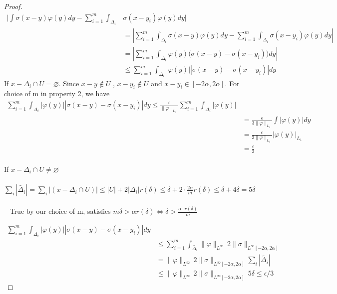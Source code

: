 \documentclass[../main.tex]{subfiles}
\begin{document}
\begin{proof}
\begin{equation*} 
	\begin{split}
		\Bigg| \int \sigma(x-y)\varphi(y)dy -  \sum_{i=1}^m \int_{\Delta_i}& \sigma(x-y_i) \varphi(y)dy \Bigg|  \\
		& = \left|  \sum_{i=1}^m \int_{\Delta_i}\sigma(x-y)\varphi(y)dy -  \sum_{i=1}^m \int_{\Delta_i}\sigma(x-y_i)\varphi(y)dy \right|  \\
		& =  \left|  \sum_{i=1}^m \int_{\Delta_i}\varphi(y)\Big( \sigma(x-y) - \sigma(x-y_i)\Big)dy \right| \\
		&\leq  \sum_{i=1}^m \int_{\Delta_i} \left| \varphi(y)\right| \left| \sigma(x-y)-\sigma(x-y_i)\right|dy 
	\end{split}
\end{equation*}
		If $x-\Delta_i \cap U = \varnothing $. Since $x-y \notin U$ , $x-y_i \notin U$ and $x-y_i \in [-2\alpha,2\alpha]$. For choice of m in property 2, we have\\ 
		\begin{equation*}
			\begin{split}
				\sum_{i=1}^m  \int_{\Delta_i} \left| \varphi(y)\right| \left| \sigma(x-y)-\sigma(x-y_i)\right|dy  \leq  \frac{\epsilon}{\| \varphi\|_{L_1}}  \sum_{i=1}^m  \int_{\Delta_i} \left| \varphi(y)\right| & \\
				& =  \frac{\epsilon}{3\| \varphi\|_{L_1}} \int \left|\varphi(y)\right| dy \\
				& =  \frac{\epsilon}{3\| \varphi\|_{L_1}} \left|\varphi(y)\right|_{L_1}  \\
				& = \frac{\epsilon}{3} 
			\end{split}
		\end{equation*}
		\\ 
		\noindent If $x-\Delta_i \cap U \neq \varnothing$\\ \\ 
		$\sum_i |\tilde{\Delta_i}| = \sum_i|(x-\Delta_i \cap U)| \leq |U|+2|\Delta_i| r(\delta) \leq \delta + 2 \cdot \frac{2\alpha}{m} r(\delta) \leq \delta +4\delta = 5\delta$  \\ \\ 
		True by our choice of m, satisfies $m\delta > \alpha r(\delta) \iff \delta > \frac{\alpha \cdot r(\delta)}{m}$
		
		
		\begin{equation*}
			\begin{split}
				\sum_{i=1}^m  \int_{\tilde{\Delta_i}} \left| \varphi(y)\right| \left| \sigma(x-y)-\sigma(x-y_i)\right|dy & \\
				&  \leq  \sum_{i=1}^m  \int_{\tilde{\Delta_i}} \| \varphi\|_{L^{\infty}} \, 2 \| \sigma \|_{L^{\infty}[-2\alpha,2\alpha]} \\
				& = \| \varphi\|_{L^{\infty}} \, 2 \| \sigma \|_{L^{\infty}[-2\alpha,2\alpha]} \sum_i| \tilde{\Delta_i} | \\
				& \leq \| \varphi\|_{L^{\infty}} \, 2 \| \sigma \|_{L^{\infty}[-2\alpha,2\alpha]} \, 5 \delta \leq \epsilon /3
			\end{split}
		\end{equation*}


\end{proof}
\end{document}
